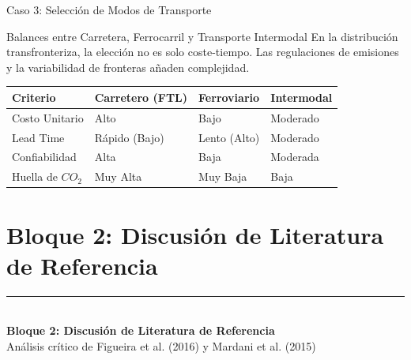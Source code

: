 \documentclass[aspectratio=169, 10pt]{beamer}
\begin{document}
\begin{frame}{Caso 3: Selección de Modos de Transporte}
    \begin{alertblock}{Balances entre Carretera, Ferrocarril y Transporte Intermodal}
        En la distribución transfronteriza, la elección no es solo coste-tiempo. Las regulaciones de emisiones y la variabilidad de fronteras añaden complejidad.
    \end{alertblock}
    \begin{table}
        \centering
        \scriptsize
        \begin{tabular}{llll}
            \toprule
            \textbf{Criterio} & \textbf{Carretero (FTL)} & \textbf{Ferroviario} & \textbf{Intermodal} \\
            \midrule
            Costo Unitario & Alto & Bajo & Moderado \\
            Lead Time & Rápido (Bajo) & Lento (Alto) & Moderado \\
            Confiabilidad & Alta & Baja & Moderada \\
            Huella de $CO_2$ & Muy Alta & Muy Baja & Baja \\
            \bottomrule
        \end{tabular}
    \end{table}
\end{frame}

\section{Bloque 2: Discusión de Literatura de Referencia}
\begingroup
{}
\begin{frame}[plain]
    \vfill
    \hspace{0.08\paperwidth}%
    {\color{UANLgold}\rule{4cm}{2pt}}\\[8pt]%
    \hspace{0.08\paperwidth}%
    {\color{FIMEwhite}\LARGE\rmfamily\bfseries Bloque 2: Discusión de Literatura de Referencia}\\[6pt]
    \hspace{0.08\paperwidth}%
    {\color{FIMEwhite!85}\large\sffamily Análisis crítico de Figueira et al. (2016) y Mardani et al. (2015)}
    \vfill
\end{frame}
\endgroup
\end{document}
